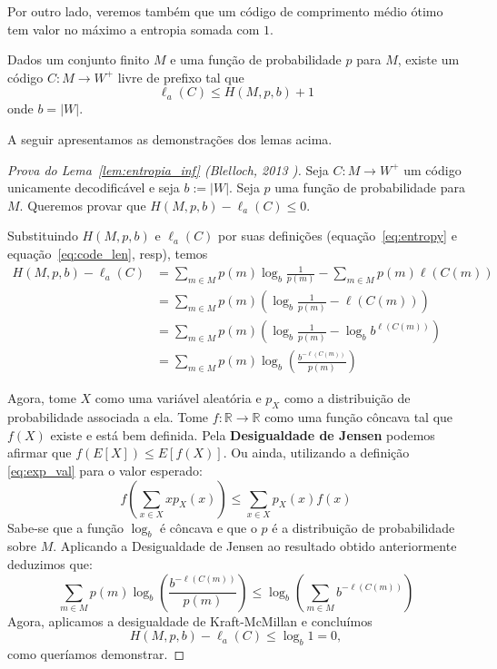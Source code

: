 Por outro lado, veremos também que um código de comprimento médio ótimo tem valor no máximo a entropia somada com $1$.

\begin{lemma}
  \label{lem:entropia_sup}
  Dados um conjunto finito $M$ e uma função de probabilidade $p$ para
  $M$, existe um código $C:M\to W^+$ livre de prefixo tal que
  \begin{equation*}
    \ell_a(C) \leq H(M, p, b) + 1
  \end{equation*}
  onde $b = |W|$.
\end{lemma}

  A seguir apresentamos as demonstrações dos lemas acima.
  
  \begin{proof}[Prova do Lema~\ref{lem:entropia_inf} (Blelloch, 2013 \cite{Ble})]
    Seja $C:M\to W^+$ um código unicamente decodificável e seja $b :=
    |W|$. Seja $p$ uma função de probabilidade para $M$. Queremos
    provar que $H(M, p,b) - \ell_a(C) \leq 0$.

    Substituindo $H(M,p, b)$ e $\ell_a(C)$ por suas definições
    (equação~\eqref{eq:entropy} e equação~\eqref{eq:code_len}, resp),
    temos
    \begin{align*}
      H(M, p, b) - \ell_a(C)
      &=
      \sum_{m \in M} p(m) \log_b \frac{1}{p(m)}
      - \sum_{m \in M}^{}p(m) \ell(C(m)) \\
      &=
      \sum_{m \in M} p(m) \left(
      \log_b \frac{1}{p(m)} - \ell(C(m))
      \right) \\
      &=
      \sum_{m \in M} p(m) \left(
      \log_b \frac{1}{p(m)} - \log_b b^{\ell(C(m))}
      \right) \\
      &= \sum_{m \in M}^{}p(m) \log_b \left(\frac{b^{-\ell(C(m))}}{p(m)}\right)
    \end{align*}

    Agora, tome $X$ como uma variável aleatória e $p_X$ como a distribuição de probabilidade associada a ela.
    Tome $f:\mathbb{R}\to\mathbb{R}$ como uma função côncava tal que $f(X)$ existe e está bem definida.
    Pela \textbf{Desigualdade de Jensen} podemos afirmar que $f(E[X]) \leq E[f(X)]$.
    Ou ainda, utilizando a definição \ref{eq:exp_val} para o valor esperado:
    \begin{equation*}
    f(\sum_{x \in X}^{}xp_X(x)) \leq \sum_{x \in X}^{}p_X(x)f(x)
    \end{equation*}
    Sabe-se que a função $\log_b$ é côncava e que o $p$ é a distribuição de probabilidade sobre $M$.
    Aplicando a Desigualdade de Jensen ao resultado obtido anteriormente deduzimos que:
\begin{equation*}
  \sum_{m \in M}^{}p(m) \log_b  \left(\frac{b^{-\ell(C(m))}}{p(m)}\right)
  \leq
  \log_b\left(\sum_{m \in M} b^{-\ell(C(m))}\right)
\end{equation*}
Agora, aplicamos a desigualdade de Kraft-McMillan e concluímos
\begin{equation*}
  H(M, p, b) - \ell_a(C)
  \leq
  \log_b 1 = 0,
\end{equation*}
como queríamos demonstrar.
\end{proof}


